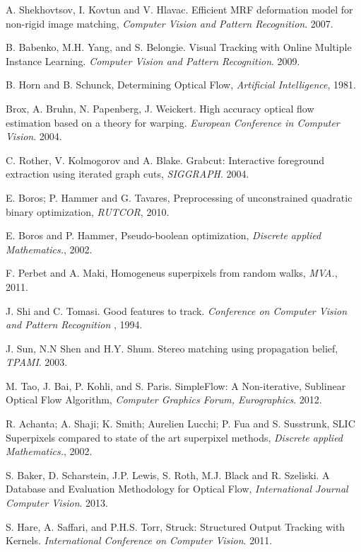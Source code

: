 \begin{thebibliography}{99}

A. Shekhovtsov, I. Kovtun and V. Hlavac. Efficient MRF deformation model for non-rigid image matching, {\it Computer Vision and Pattern Recognition}. 2007.

B. Babenko, M.H. Yang, and S. Belongie. Visual Tracking with Online Multiple Instance Learning. {\it Computer Vision and Pattern Recognition}. 2009.

B. Horn and B. Schunck, Determining Optical Flow, {\it Artificial Intelligence}, 1981.

Brox, A. Bruhn, N. Papenberg, J. Weickert. High accuracy optical flow estimation based on a theory for warping. {\it European Conference in Computer Vision}. 2004.

C. Rother, V. Kolmogorov and A. Blake. Grabcut: Interactive foreground extraction using iterated graph cuts, {\it SIGGRAPH}. 2004.

E. Boros; P. Hammer and G. Tavares, Preprocessing of unconstrained quadratic binary optimization, {\it RUTCOR}, 2010.

E. Boros and P. Hammer, Pseudo-boolean optimization, {\it Discrete applied Mathematics.}, 2002.

F. Perbet and A. Maki, Homogeneus superpixels from random walks, {\it MVA.}, 2011.

J. Shi and C. Tomasi. Good features to track. {\it Conference on Computer Vision and Pattern Recognition }, 1994. 

J. Sun, N.N Shen and H.Y. Shum. Stereo matching using propagation belief, {\it TPAMI}. 2003.

M. Tao, J. Bai, P. Kohli, and S. Paris. SimpleFlow: A Non-iterative, Sublinear Optical Flow Algorithm, {\it Computer Graphics Forum, Eurographics}. 2012.

R. Achanta; A. Shaji; K. Smith; Aurelien Lucchi; P. Fua and S. Susstrunk, SLIC Superpixels compared to state of the art superpixel methods, {\it Discrete applied Mathematics.}, 2002.

S. Baker, D. Scharstein, J.P. Lewis, S. Roth, M.J. Black and R. Szeliski. A Database and Evaluation Methodology for Optical Flow, {\it International Journal Computer Vision}. 2013.

S. Hare, A. Saffari, and P.H.S. Torr, Struck: Structured Output Tracking with Kernels.  {\it International Conference on Computer Vision}. 2011.


\end{thebibliography}
